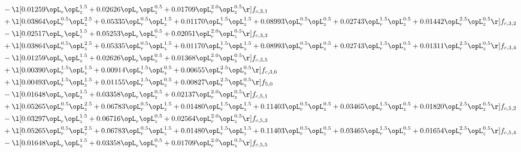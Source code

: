 \begin{alignat}{2}
& - \l[  0.01259 \opL_r \opL_z^{1.5} +  0.02626 \opL_r \opL_z^{0.5} +  0.01709 \opL_r^{2.0} \opL_z^{0.5}  \r] f_{c,3,1} \nonumber \\ 
& + \l[  0.03864 \opL_r^{0.5} \opL_z^{2.5} +  0.05335 \opL_r^{0.5} \opL_z^{1.5} +  0.01170 \opL_r^{1.5} \opL_z^{1.5} +  0.08993 \opL_r^{0.5} \opL_z^{0.5} +  0.02743 \opL_r^{1.5} \opL_z^{0.5} +  0.01442 \opL_r^{2.5} \opL_z^{0.5}  \r] f_{c,3,2} \nonumber \\ 
& - \l[  0.02517 \opL_r \opL_z^{1.5} +  0.05253 \opL_r \opL_z^{0.5} +  0.02051 \opL_r^{2.0} \opL_z^{0.5}  \r] f_{c,3,3} \nonumber \\ 
& + \l[  0.03864 \opL_r^{0.5} \opL_z^{2.5} +  0.05335 \opL_r^{0.5} \opL_z^{1.5} +  0.01170 \opL_r^{1.5} \opL_z^{1.5} +  0.08993 \opL_r^{0.5} \opL_z^{0.5} +  0.02743 \opL_r^{1.5} \opL_z^{0.5} +  0.01311 \opL_r^{2.5} \opL_z^{0.5}  \r] f_{c,3,4} \nonumber \\ 
& - \l[  0.01259 \opL_r \opL_z^{1.5} +  0.02626 \opL_r \opL_z^{0.5} +  0.01368 \opL_r^{2.0} \opL_z^{0.5}  \r] f_{c,3,5} \nonumber \\ 
& + \l[  0.00390 \opL_r^{1.5} \opL_z^{1.5} +  0.00914 \opL_r^{1.5} \opL_z^{0.5} +  0.00655 \opL_r^{2.5} \opL_z^{0.5}  \r] f_{c,3,6} \nonumber \\ 
& + \l[  0.00493 \opL_r^{1.5} \opL_z^{1.5} +  0.01155 \opL_r^{1.5} \opL_z^{0.5} +  0.00827 \opL_r^{2.5} \opL_z^{0.5}  \r] f_{5,0} \nonumber \\ 
& - \l[  0.01648 \opL_r \opL_z^{1.5} +  0.03358 \opL_r \opL_z^{0.5} +  0.02137 \opL_r^{2.0} \opL_z^{0.5}  \r] f_{c,5,1} \nonumber \\ 
& + \l[  0.05265 \opL_r^{0.5} \opL_z^{2.5} +  0.06783 \opL_r^{0.5} \opL_z^{1.5} +  0.01480 \opL_r^{1.5} \opL_z^{1.5} +  0.11403 \opL_r^{0.5} \opL_z^{0.5} +  0.03465 \opL_r^{1.5} \opL_z^{0.5} +  0.01820 \opL_r^{2.5} \opL_z^{0.5}  \r] f_{c,5,2} \nonumber \\ 
& - \l[  0.03297 \opL_r \opL_z^{1.5} +  0.06716 \opL_r \opL_z^{0.5} +  0.02564 \opL_r^{2.0} \opL_z^{0.5}  \r] f_{c,5,3} \nonumber \\ 
& + \l[  0.05265 \opL_r^{0.5} \opL_z^{2.5} +  0.06783 \opL_r^{0.5} \opL_z^{1.5} +  0.01480 \opL_r^{1.5} \opL_z^{1.5} +  0.11403 \opL_r^{0.5} \opL_z^{0.5} +  0.03465 \opL_r^{1.5} \opL_z^{0.5} +  0.01654 \opL_r^{2.5} \opL_z^{0.5}  \r] f_{c,5,4} \nonumber \\ 
& - \l[  0.01648 \opL_r \opL_z^{1.5} +  0.03358 \opL_r \opL_z^{0.5} +  0.01709 \opL_r^{2.0} \opL_z^{0.5}  \r] f_{c,5,5} \nonumber \\ 

\end{alignat}
